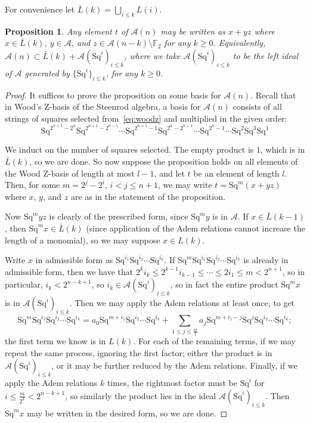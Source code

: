 \documentclass{article}
\newcommand{\A}{\mathcal{A}}
\newcommand{\F}{\mathbb{F}}
\newcommand{\Sq}{\mathrm{Sq}}
\newtheorem{prop}{Proposition}
\begin{document}
  For convenience let $\bar{L}(k)=\bigcup_{i\leq k}L(i)$.

  \begin{prop}
    Any element $t$ of $\A(n)$ may be written as $x + yz$ where $x\in \bar{L}(k)$, $y\in \A$, and $z\in\A(n-k)\setminus \F_2$ for any $k\geq 0$.  Equivalently, $\A(n)\subset \bar{L}(k) + \A(\Sq^i)_{i\leq k}$, where we take $\A(\Sq^i)_{i\leq k}$ to be the left ideal of $\A$ generated by $\{\Sq^i\}_{i\leq k}$, for any $k\geq 0$.
  \end{prop}

  \begin{proof}
    It suffices to prove the proposition on some basis for $\A(n)$.  Recall that in Wood's Z-basis of the Steenrod algebra, a basis for $\A(n)$ consists of all strings of squares selected from~\eqref{eq:woodz} and multiplied in the given order:
    \begin{equation} \label{eq:woodz}
      \Sq^{2^{n+1}-2^n}\Sq^{2^{n+1}-2^{n-1}}\cdots\Sq^{2^{n+1}-1} \Sq^{2^n-2^{n-1}}\cdots\Sq^{2^n-1}\cdots\Sq^2\Sq^3\Sq^1
    \end{equation}

    We induct on the number of squares selected.  The empty product is $1$, which is in $\bar{L}(k)$, so we are done.  So now suppose the proposition holds on all elements of the Wood Z-basis of length at most $l-1$, and let $t$ be an element of length $l$.  Then, for some $m=2^j-2^i$, $i<j\leq n+1$, we may write $t=\Sq^m\left(x+yz\right)$ where $x$, $y$, and $z$ are as in the statement of the proposition.

    Now $\Sq^myz$ is clearly of the prescribed form, since $\Sq^my$ is in $\A$.  If $x\in\bar{L}(k-1)$, then $\Sq^m x\in \bar{L}(k)$ (since application of the Adem relations cannot increase the length of a monomial), so we may suppose $x\in L(k)$.

    Write $x$ in admissible form as $\Sq^{i_1}\Sq^{i_2}\cdots\Sq^{i_k}$.  If $\Sq^m\Sq^{i_1}\Sq^{i_2}\cdots\Sq^{i_k}$ is already in admissible form, then we have that $2^ki_k\leq 2^{k-1}i_{k-1}\leq\cdots\leq2i_1\leq m<2^{n+1}$, so in particular, $i_k<2^{n-k+1}$, so $i_k\in\A(\Sq^i)_{i\leq k}$, so in fact the entire product $\Sq^mx$ is in $\A(\Sq^i)_{i\leq k}$.  Then we may apply the Adem relations at least once, to get
    \[\Sq^m\Sq^{i_1}\Sq^{i_2}\cdots\Sq^{i_k} = a_0\Sq^{m+i_1}\Sq^{i_2}\cdots\Sq^{i_k} + \sum_{1\leq j\leq \frac{m}2}a_j\Sq^{m+i_1-j}\Sq^j\Sq^{i_2}\cdots\Sq^{i_k};\]
    the first term we know is in $L(k)$.  For each of the remaining terms, if we may repeat the same process, ignoring the first factor; either the product is in $\A(\Sq^i)_{i\leq k}$, or it may be further reduced by the Adem relations.  Finally, if we apply the Adem relations $k$ times, the rightmost factor must be $\Sq^i$ for $i\leq \frac{m}{2^k}<2^{n-k+1}$, so similarly the product lies in the ideal $\A(\Sq^i)_{i\leq k}$.  Then $\Sq^mx$ may be written in the desired form, so we are done.
  \end{proof}
\end{document}
